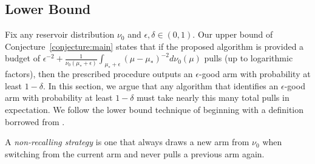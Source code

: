 

\subsection{Lower Bound}

Fix any reservoir distribution $\nu_0$ and $\epsilon,\delta \in (0,1)$. 
Our upper bound of Conjecture~\ref{conjecture:main} states that if the proposed algorithm is provided a budget of $\epsilon^{-2} + \frac{1}{\nu_0(\mu_* + \epsilon)}\int_{\mu_*+\epsilon} (\mu-\mu_*)^{-2} d\nu_0(\mu)$ pulls (up to logarithmic factors), then the prescribed procedure outputs an $\epsilon$-good arm with probability at least $1-\delta$.
In this section, we argue that any algorithm that identifies an $\epsilon$-good arm with probability at least $1-\delta$ must take nearly this many total pulls in expectation.
We follow the lower bound technique of \cite{malloy2012quickest} beginning with a definition borrowed from \cite{berry1997}.
\begin{definition}
A \emph{non-recalling strategy} is one that always draws a new arm from $\nu_0$ when switching from the current arm and never pulls a previous arm again.
\end{definition}

